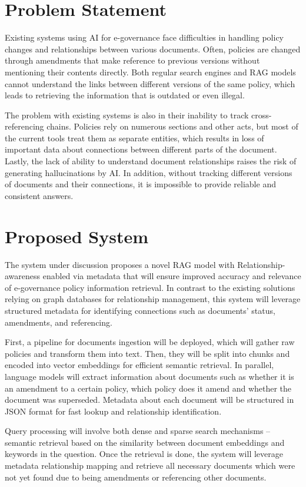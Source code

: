 \documentclass[conference]{IEEEtran}
\begin{document}
\section{Problem Statement}
Existing systems using AI for e-governance face difficulties in handling policy changes and relationships between various documents. Often, policies are changed through amendments that make reference to previous versions without mentioning their contents directly. Both regular search engines and RAG models cannot understand the links between different versions of the same policy, which leads to retrieving the information that is outdated or even illegal.

The problem with existing systems is also in their inability to track cross-referencing chains. Policies rely on numerous sections and other acts, but most of the current tools treat them as separate entities, which results in loss of important data about connections between different parts of the document. Lastly, the lack of ability to understand document relationships raises the risk of generating hallucinations by AI. In addition, without tracking different versions of documents and their connections, it is impossible to provide reliable and consistent answers.

\section{Proposed System}
The system under discussion proposes a novel RAG model with Relationship-awareness enabled via metadata that will ensure improved accuracy and relevance of e-governance policy information retrieval. In contrast to the existing solutions relying on graph databases for relationship management, this system will leverage structured metadata for identifying connections such as documents' status, amendments, and referencing.

First, a pipeline for documents ingestion will be deployed, which will gather raw policies and transform them into text. Then, they will be split into chunks and encoded into vector embeddings for efficient semantic retrieval. In parallel, language models will extract information about documents such as whether it is an amendment to a certain policy, which policy does it amend and whether the document was superseded. Metadata about each document will be structured in JSON format for fast lookup and relationship identification.

Query processing will involve both dense and sparse search mechanisms – semantic retrieval based on the similarity between document embeddings and keywords in the question. Once the retrieval is done, the system will leverage metadata relationship mapping and retrieve all necessary documents which were not yet found due to being amendments or referencing other documents.
\end{document}
